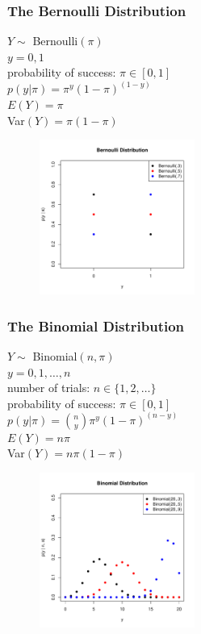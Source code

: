 \documentclass[handout]{beamer}
\begin{document}
\begin{frame}
\frametitle{The Bernoulli Distribution}
\begin{multicols}{2}
\pause
$Y \sim$ Bernoulli$(\pi)$\\
\bigskip
\pause
$y = 0,1$\\
\bigskip
\pause
probability of success: $\pi \in [0,1]$\\
\bigskip
\pause
$p(y|\pi) = \pi^y (1 - \pi)^{(1-y)}$\\
\bigskip
\bigskip
\pause
$E(Y) = \pi$\\
\bigskip
\pause
Var$(Y) = \pi (1 - \pi)$
\pause


\begin{figure}[!htp]
\begin{center}
\includegraphics[width=2in, height=2in]{probability-bernoulli.pdf}
\end{center}
\end{figure}
\end{multicols}
\end{frame}



\begin{frame}
\frametitle{The Binomial Distribution}
\begin{multicols}{2}
\pause
$Y \sim$ Binomial$(n, \pi)$\\
\bigskip
\pause
$y = 0,1,\dots,n$\\
\bigskip
\pause
number of trials: $n \in \{1,2,\dots \}$\\
\pause
probability of success: $\pi \in [0,1]$\\
\bigskip
\pause
$p(y|\pi) = \binom{n}{y} \pi^y (1 - \pi)^{(n-y)}$\\
\bigskip
\bigskip
\pause
$E(Y) = n \pi$\\
\bigskip
\pause
Var$(Y) = n \pi (1 - \pi)$
\pause


\begin{figure}[!htp]
\begin{center}
\includegraphics[width=2in, height=2in]{probability-binomial.pdf}
\end{center}
\end{figure}
\end{multicols}
\end{frame}
\end{document}
